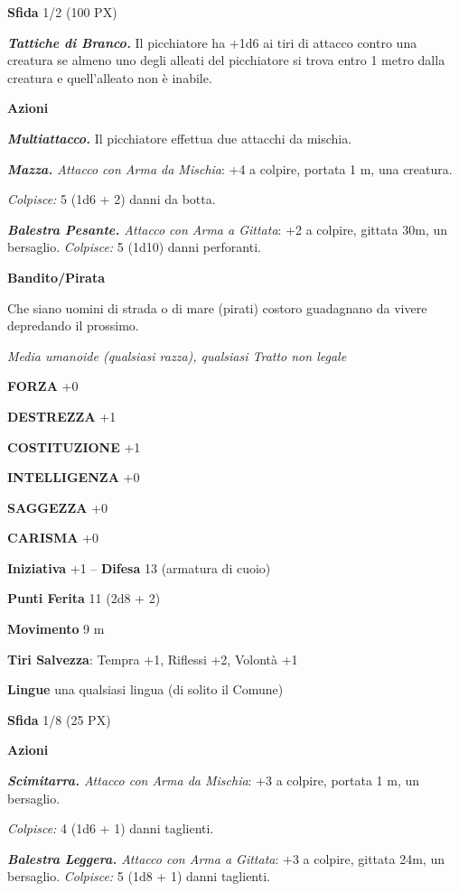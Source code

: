 \begin{multicols}{2}
	\textbf{Sfida} 1/2 (100 PX)

	\textit{\textbf{Tattiche di Branco.}} Il picchiatore ha +1d6 ai tiri di attacco contro una creatura se almeno uno degli alleati del picchiatore si trova entro 1 metro dalla creatura e quell'alleato non
	è inabile.

	\textbf{Azioni}

	\textit{\textbf{Multiattacco.}} Il picchiatore effettua due attacchi da mischia.

	\textit{\textbf{Mazza.} Attacco con Arma da Mischia}: +4 a colpire, portata 1 m, una creatura.

	\textit{Colpisce:} 5 (1d6 + 2) danni da botta.

	\textit{\textbf{Balestra Pesante.} Attacco con Arma a Gittata}: +2 a colpire, gittata 30m, un bersaglio. \textit{Colpisce:} 5 (1d10) danni perforanti.

	\medskip\textbf{Bandito/Pirata}

	Che siano uomini di strada o di mare (pirati) costoro guadagnano da vivere depredando il prossimo.

	\textit{Media umanoide (qualsiasi razza), qualsiasi Tratto non legale}

	\textbf{FORZA} +0

	\textbf{DESTREZZA} +1

	\textbf{COSTITUZIONE} +1

	\textbf{INTELLIGENZA} +0

	\textbf{SAGGEZZA} +0

	\textbf{CARISMA} +0

	\textbf{Iniziativa} +1 -- \textbf{Difesa} 13 (armatura di cuoio)

	\textbf{Punti Ferita} 11 (2d8 + 2)

	\textbf{Movimento} 9 m

	\textbf{Tiri Salvezza}: Tempra +1, Riflessi +2, Volontà +1

	\textbf{Lingue} una qualsiasi lingua (di solito il Comune)

	\textbf{Sfida} 1/8 (25 PX)

	\textbf{Azioni}

	\textit{\textbf{Scimitarra.} Attacco con Arma da Mischia}: +3 a colpire, portata 1 m, un bersaglio.

	\textit{Colpisce:} 4 (1d6 + 1) danni taglienti.

	\textit{\textbf{Balestra Leggera.} Attacco con Arma a Gittata}: +3 a colpire, gittata 24m, un bersaglio. \textit{Colpisce:} 5 (1d8 + 1) danni taglienti.


\end{multicols}

